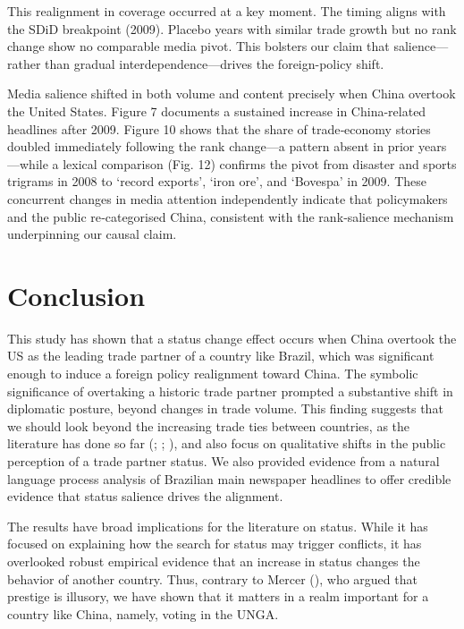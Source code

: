 \documentclass[
  12pt,
]{article}
\begin{document}
This realignment in coverage occurred at a key moment. The timing aligns
with the SDiD breakpoint (2009). Placebo years with similar trade growth
but no rank change show no comparable media pivot. This bolsters our
claim that salience---rather than gradual interdependence---drives the
foreign-policy shift.

Media salience shifted in both volume and content precisely when China
overtook the United States. Figure 7 documents a sustained increase in
China-related headlines after 2009. Figure 10 shows that the share of
trade‑economy stories doubled immediately following the rank change---a
pattern absent in prior years---while a lexical comparison (Fig. 12)
confirms the pivot from disaster and sports trigrams in 2008 to `record
exports', `iron ore', and `Bovespa' in 2009. These concurrent changes in
media attention independently indicate that policymakers and the public
re‑categorised China, consistent with the rank‑salience mechanism
underpinning our causal claim.

\section{Conclusion}\label{conclusion}

This study has shown that a status change effect occurs when China
overtook the US as the leading trade partner of a country like Brazil,
which was significant enough to induce a foreign policy realignment
toward China. The symbolic significance of overtaking a historic trade
partner prompted a substantive shift in diplomatic posture, beyond
changes in trade volume. This finding suggests that we should look
beyond the increasing trade ties between countries, as the literature
has done so far (;
;
), and also focus on qualitative
shifts in the public perception of a trade partner status. We also
provided evidence from a natural language process analysis of Brazilian
main newspaper headlines to offer credible evidence that status salience
drives the alignment.

The results have broad implications for the literature on status. While
it has focused on explaining how the search for status may trigger
conflicts, it has overlooked robust empirical evidence that an increase
in status changes the behavior of another country. Thus, contrary to
Mercer (), who argued that prestige is
illusory, we have shown that it matters in a realm important for a
country like China, namely, voting in the UNGA.
\end{document}
